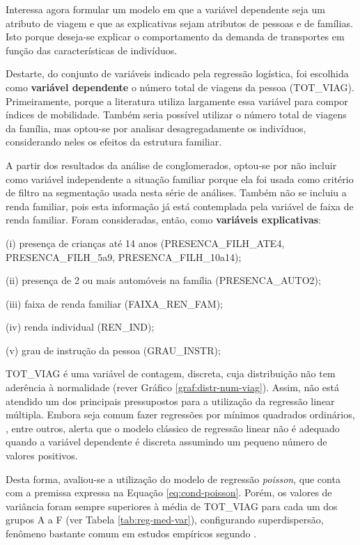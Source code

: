 Interessa agora formular um modelo em que a variável dependente seja um atributo de viagem e que as explicativas sejam atributos de pessoas e de famílias.
Isto porque deseja-se explicar o comportamento da demanda de transportes em função das características de indivíduos. 

Destarte, do conjunto de variáveis indicado pela regressão logística, foi escolhida como \textbf{variável dependente} o número total de viagens da pessoa (TOT_VIAG). 
Primeiramente, porque a literatura utiliza largamente essa variável para compor índices de mobilidade. 
Também seria possível utilizar o número total de viagens da família, mas optou-se por analisar desagregadamente os indivíduos, considerando neles os efeitos da estrutura familiar.

A partir dos resultados da análise de conglomerados, optou-se por não incluir como variável independente a situação familiar porque ela foi usada como critério de filtro na segmentação usada nesta série de análises. 
Também não se incluiu a renda familiar, pois esta informação já está contemplada pela variável de faixa de renda familiar. 
Foram consideradas, então, como \textbf{variáveis explicativas}:

\begin{compactitem}[]
\item (i) presença de crianças até 14 anos (PRESENCA_FILH_ATE4, PRESENCA_FILH_5a9, PRESENCA_FILH_10a14); 
\item (ii) presença de 2 ou mais automóveis na família (PRESENCA_AUTO2); 
\item (iii) faixa de renda familiar (FAIXA_REN_FAM); 
\item (iv) renda individual (REN_IND); 
\item (v) grau de instrução da pessoa (GRAU_INSTR);
\end{compactitem}

TOT_VIAG é uma variável de contagem, discreta, cuja distribuição não tem aderência à normalidade (rever Gráfico \ref{graf:distr-num-viag}). Assim, não está atendido um dos principais pressupostos para a utilização da regressão linear múltipla. 
Embora seja comum fazer regressões por mínimos quadrados ordinários, , entre outros, alerta que o modelo clássico de regressão linear não é adequado quando a variável dependente é discreta assumindo um pequeno número de valores positivos.

Desta forma, avaliou-se a utilização do modelo de regressão \textit{poisson}, que conta com a premissa expressa na Equação \eqref{eq:cond-poisson}. Porém, os valores de variância foram sempre superiores à média de TOT_VIAG para cada um dos grupos A a F (ver Tabela \ref{tab:reg-med-var}), configurando superdispersão, fenômeno bastante comum em estudos empíricos segundo .


